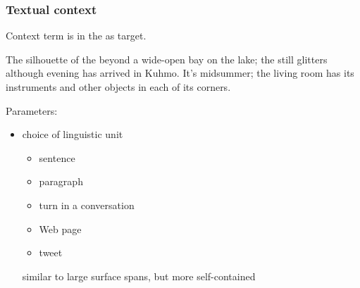 \documentclass[t]{beamer} %
\begin{document}
\begin{frame}
  \frametitle{Textual context}
  
  \begin{center}
    Context term is in the  as target.
  \end{center}

  {\color{secondary}The silhouette of the} 
  {\color{secondary}beyond a wide-open bay on the lake; the}
   {\color{secondary}still glitters although evening has
    arrived in Kuhmo.} It's midsummer; the living room has its
  instruments and other objects in each of its corners.
  
  \gap
  Parameters:
  \begin{itemize}
  \item choice of linguistic unit
    \begin{itemize}
    \item sentence
    \item paragraph
    \item turn in a conversation
    \item Web page
    \item tweet
    \end{itemize}
  \itemhand similar to large surface spans, but more self-contained
  \end{itemize}
\end{frame}
\end{document}
